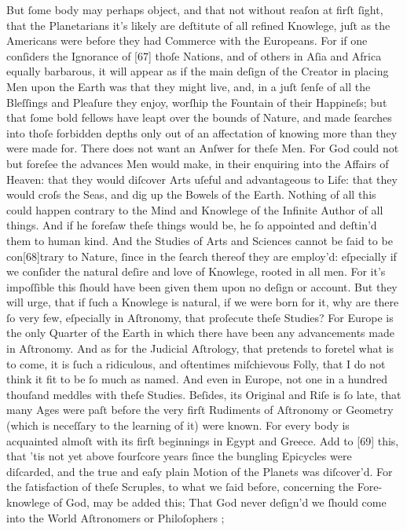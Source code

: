 \documentclass[letterpaper]{book}
\begin{document}
But ſome body may perhaps object, and that not without reaſon at firſt
ſight, that the Planetarians it's likely are deſtitute of all refined
Knowlege, juſt as the Americans were before they had Commerce with the
Europeans.  For if one conſiders the Ignorance of [67] thoſe Nations, and of
others in Aſia and Africa equally barbarous, it will appear as if the main
deſign of the Creator in placing Men upon the Earth was that they might
live, and, in a juſt ſenſe of all the Bleſſings and Pleaſure they enjoy,
worſhip the Fountain of their Happineſs; but that ſome bold fellows have
leapt over the bounds of Nature, and made ſearches into thoſe forbidden
depths only out of an affectation of knowing more than they were made for.
There does not want an Anſwer for theſe Men. For God could not but foreſee
the advances Men would make, in their enquiring into the Affairs of Heaven:
that they would diſcover Arts uſeful and advantageous to Life: that they
would croſs the Seas, and dig up the Bowels of the Earth. Nothing of all
this could happen contrary to the Mind and Knowlege of the Infinite Author
of all things. And if he foreſaw theſe things would be, he ſo appointed and
deſtin'd them to human kind. And the Studies of Arts and Sciences cannot be
ſaid to be con[68]trary to Nature, ſince in the ſearch thereof they are
employ'd: eſpecially if we conſider the natural deſire and love of Knowlege,
rooted in all men. For it's impoſſible this ſhould have been given them upon
no deſign or account. But they will urge, that if ſuch a Knowlege is
natural, if we were born for it, why are there ſo very few, eſpecially in
Aſtronomy, that proſecute theſe Studies? For Europe is the only Quarter of
the Earth in which there have been any advancements made in Aſtronomy. And
as for the Judicial Aſtrology, that pretends to foretel what is to come, it
is ſuch a ridiculous, and oftentimes miſchievous Folly, that I do not think
it fit to be ſo much as named. And even in Europe, not one in a hundred
thouſand meddles with theſe Studies. Beſides, its Original and Riſe is ſo
late, that many Ages were paſt before the very firſt Rudiments of Aſtronomy
or Geometry (which is neceſſary to the learning of it) were known. For every
body is acquainted almoſt with its firſt beginnings in Egypt and Greece.
Add to [69] this, that 'tis not yet above fourſcore years ſince the bungling
Epicycles were diſcarded, and the true and eaſy plain Motion of the Planets
was diſcover'd. For the ſatisfaction of theſe Scruples, to what we ſaid
before, concerning the Fore-knowlege of God, may be added this; That God
never deſign'd we ſhould come into the World Aſtronomers or Philoſophers ;
\end{document}
